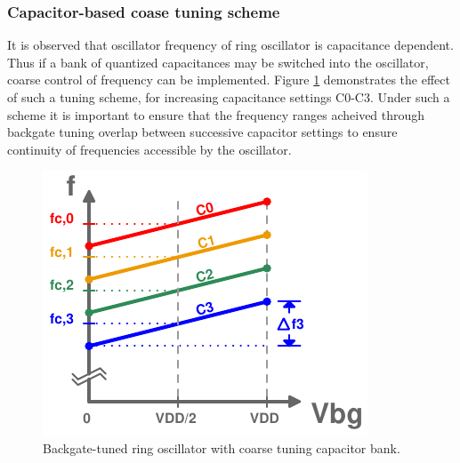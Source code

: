 		\subsubsection{Capacitor-based coase tuning scheme}
		It is observed that oscillator frequency of ring oscillator is capacitance dependent. Thus if a bank of quantized capacitances may be switched into the oscillator, coarse control of frequency can be implemented. Figure \ref{fig:rosc_tuning} demonstrates the effect of such a tuning scheme, for increasing capacitance settings C0-C3. Under such a scheme it is important to ensure that the frequency ranges acheived through backgate tuning overlap between successive capacitor settings to ensure continuity of frequencies accessible by the oscillator. 
		\FloatBarrier
		\begin{figure}[htb!]
			\center\includegraphics[width=0.4\linewidth, angle=0]{figs/backgate_rosc_tuning2.pdf}
			\caption{Backgate-tuned ring oscillator with coarse tuning capacitor bank.}
			\label{fig:rosc_tuning}
		\end{figure}

		
		\FloatBarrier\pagebreak
